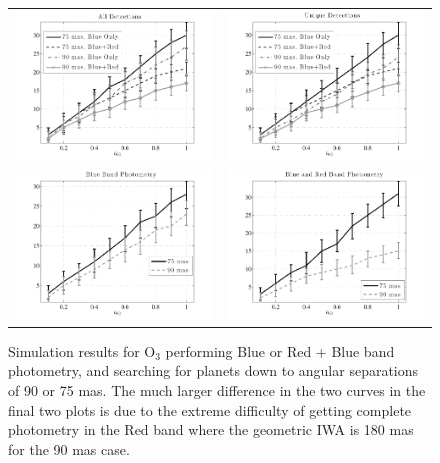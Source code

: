 \begin{figure}[ht!]
 \begin{center}
  \begin{tabular}{c c}
   \includegraphics[width=2.9in,clip=true,trim=0.25in 0in 0.5in 0in]{./figures/comp2A} &
   \includegraphics[width=2.9in,clip=true,trim=0.25in 0in 0.5in 0in]{./figures/comp2B} \\
      \includegraphics[width=2.9in,clip=true,trim=0.25in 0in 0.5in 0in]{./figures/comp2C} &
   \includegraphics[width=2.9in,clip=true,trim=0.25in 0in 0.5in 0in]{./figures/comp2D} 
  \end{tabular}
 \end{center}
 \caption[O$_3$ simulation results]{ \label{fig:comp2} Simulation results for O$_3$ performing Blue or Red + Blue band photometry, and searching for planets down to angular separations of 90 or 75 mas. The much larger difference in the two curves in the final two plots is due to the extreme difficulty of getting complete photometry in the Red band where the geometric IWA is 180 mas for the 90 mas case.}
 \end{figure}
 
